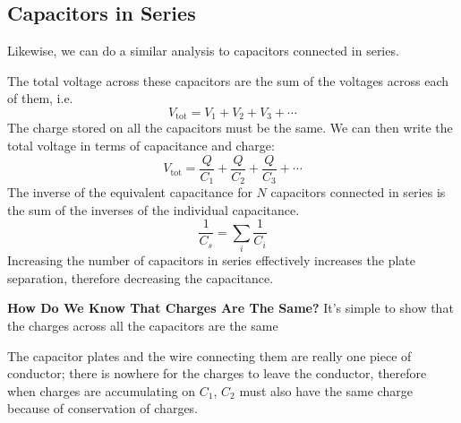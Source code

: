\subsection{Capacitors in Series}
Likewise, we can do a similar analysis to capacitors connected in series.
\begin{figure}[ht]
  \centering
\end{figure}
The total voltage across these capacitors are the sum of the voltages across
each of them, i.e.\
\begin{equation}
  V_\text{tot}=V_1+V_2+V_3+\cdots
\end{equation}
The charge stored on all the capacitors must be the same. We can then write the
total voltage in terms of capacitance and charge:
\begin{equation}
  V_\text{tot}=\frac Q{C_1}+\frac Q{C_2}+\frac Q{C_3}+\cdots
\end{equation}
The inverse of the equivalent capacitance for $N$ capacitors connected in
series is the sum of the inverses of the individual capacitance.
\begin{equation}
  \boxed{
    \frac1{C_s}=\sum_i\frac1{C_i}
  }
\end{equation}
Increasing the number of capacitors in series effectively increases the plate
separation, therefore decreasing the capacitance.
  


\textbf{How Do We Know That Charges Are The Same?} It's simple to show that the
charges across all the capacitors are the same
\begin{figure}[ht]
  \centering
\end{figure}
The capacitor plates and the wire connecting them are really one piece of
conductor; there is nowhere for the charges to leave the conductor, therefore
when charges are accumulating on $C_1$, $C_2$ must also have the same charge
because of conservation of charges.



